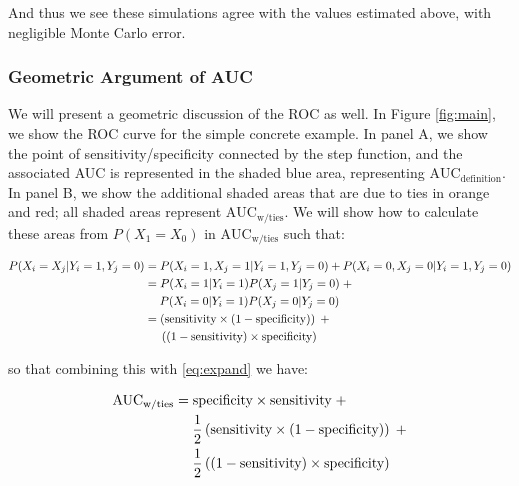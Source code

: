 \documentclass[smallextended]{svjour3}       %
\begin{document}
And thus we see these simulations agree with the values estimated above,
with negligible Monte Carlo error.

\hypertarget{geometric-argument-of-auc}{%
\subsubsection{Geometric Argument of
AUC}\label{geometric-argument-of-auc}}

We will present a geometric discussion of the ROC as well. In Figure
\ref{fig:main}, we show the ROC curve for the simple concrete example.
In panel A, we show the point of sensitivity/specificity connected by
the step function, and the associated AUC is represented in the shaded
blue area, representing \(\text{AUC}_{\text{definition}}\). In panel B,
we show the additional shaded areas that are due to ties in orange and
red; all shaded areas represent \(\text{AUC}_{\text{w/ties}}\). We will
show how to calculate these areas from \(P(X_{1} = X_{0})\) in
\(\text{AUC}_{\text{w/ties}}\) such that:

\begin{align*}
P(X_{i} = X_{j} | Y_{i} = 1, Y_{j} = 0) &= P(X_{i} = 1, X_{j} = 1 | Y_{i} = 1, Y_{j} = 0) + P(X_{i} = 0, X_{j} = 0 | Y_{i} = 1, Y_{j} = 0) \\
&= P(X_{i} = 1 | Y_{i} = 1) P(X_{j} = 1 | Y_{j} = 0) \;+ \\
&\hspace{1.3em} P(X_{i} = 0 | Y_{i} = 1) P(X_{j} = 0 | Y_{j} = 0) \\
&= \left(\text{sensitivity} \times (1 - \text{specificity})\right) \;+ \\
&\hspace{1.3em} \left((1- \text{sensitivity}) \times \text{specificity}\right)
\end{align*}

so that combining this with \eqref{eq:expand} we have:

\begin{align*}
\text{AUC}_{\text{w/ties}} &= \text{specificity} \times \text{sensitivity} \;+ \\
&\hspace{1.3em} \frac{1}{2} \left(\text{sensitivity} \times (1 - \text{specificity})\right) \;+ \\
&\hspace{1.3em} \frac{1}{2} \left((1- \text{sensitivity}) \times \text{specificity}\right) 
\end{align*}
\end{document}
